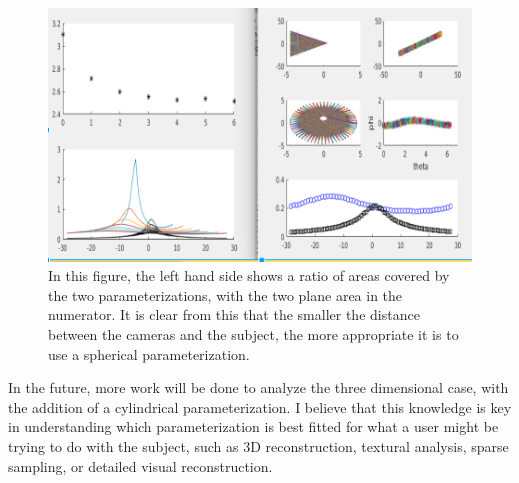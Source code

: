 \documentclass[12pt]{report}
\begin{document}
\begin{figure}[!ht]
	\centering
	\includegraphics[scale=0.40]{final_2d.png}
	\caption{In this figure, the left hand side shows a ratio of areas covered by the two parameterizations, with the two plane area in the numerator. It is clear from this that the smaller the distance between the cameras and the subject, the more appropriate it is to use a spherical parameterization.}
	\label{fig:ray_dense_2}
\end{figure}

In the future, more work will be done to analyze the three dimensional case, with the addition of a cylindrical parameterization. I believe that this knowledge is key in understanding which parameterization is best fitted for what a user might be trying to do with the subject, such as 3D reconstruction, textural analysis, sparse sampling, or detailed visual reconstruction.
\end{document}
